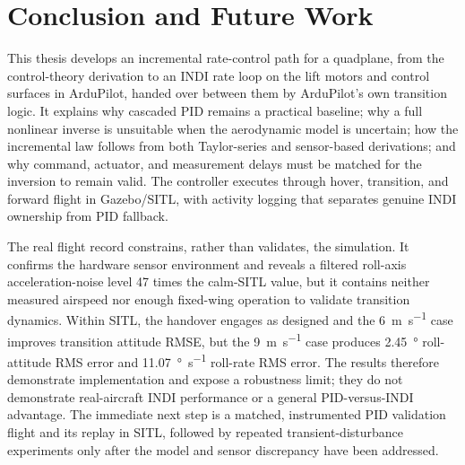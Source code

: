 \documentclass{article}
\begin{document}
\section{Conclusion and Future Work}
\label{sec:conclusion}

This thesis develops an incremental rate-control path for a quadplane, from the control-theory derivation to an INDI rate loop on the lift motors and control surfaces in ArduPilot, handed over between them by ArduPilot's own transition logic. It explains why cascaded PID remains a practical baseline; why a full nonlinear inverse is unsuitable when the aerodynamic model is uncertain; how the incremental law follows from both Taylor-series and sensor-based derivations; and why command, actuator, and measurement delays must be matched for the inversion to remain valid. The controller executes through hover, transition, and forward flight in Gazebo/SITL, with activity logging that separates genuine INDI ownership from PID fallback.

The real flight record constrains, rather than validates, the simulation. It confirms the hardware sensor environment and reveals a filtered roll-axis acceleration-noise level 47 times the calm-SITL value, but it contains neither measured airspeed nor enough fixed-wing operation to validate transition dynamics. Within SITL, the handover engages as designed and the \SI{6}{\meter\per\second} case improves transition attitude RMSE, but the \SI{9}{\meter\per\second} case produces \SI{2.45}{\degree} roll-attitude RMS error and \SI{11.07}{\degree\per\second} roll-rate RMS error. The results therefore demonstrate implementation and expose a robustness limit; they do not demonstrate real-aircraft INDI performance or a general PID-versus-INDI advantage. The immediate next step is a matched, instrumented PID validation flight and its replay in SITL, followed by repeated transient-disturbance experiments only after the model and sensor discrepancy have been addressed.
\end{document}
